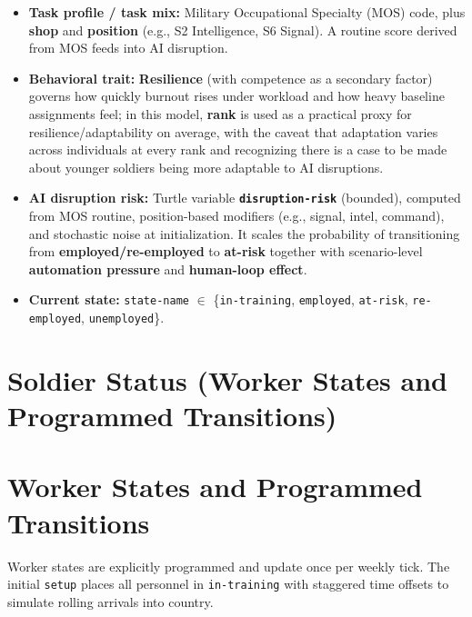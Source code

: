 \documentclass[11pt,letterpaper]{article}
\begin{document}
\begin{itemize}[leftmargin=*]
  \item \textbf{Task profile / task mix:} Military Occupational Specialty (MOS) code, plus \textbf{shop} and \textbf{position} (e.g., S2 Intelligence, S6 Signal). A routine score derived from MOS feeds into AI disruption.
  \item \textbf{Behavioral trait:} \textbf{Resilience} (with competence as a secondary factor) governs how quickly burnout rises under workload and how heavy baseline assignments feel; in this model, \textbf{rank} is used as a practical proxy for resilience/adaptability on average, with the caveat that adaptation varies across individuals at every rank and recognizing there is a case to be made about younger soldiers being more adaptable to AI disruptions.
  \item \textbf{AI disruption risk:} Turtle variable \textbf{\texttt{disruption-risk}} (bounded), computed from MOS routine, position-based modifiers (e.g., signal, intel, command), and stochastic noise at initialization. It scales the probability of transitioning from \textbf{employed/re-employed} to \textbf{at-risk} together with scenario-level \textbf{automation pressure} and \textbf{human-loop effect}.
  \item \textbf{Current state:} \texttt{state-name} $\in$ \{\texttt{in-training}, \texttt{employed}, \texttt{at-risk}, \texttt{re-employed}, \texttt{unemployed}\}.
\end{itemize}

\section{Soldier Status (Worker States and Programmed Transitions)}

\section{Worker States and Programmed Transitions}

Worker states are explicitly programmed and update once per weekly tick. The initial \texttt{setup} places all personnel in \texttt{in-training} with staggered time offsets to simulate rolling arrivals into country.
\end{document}
